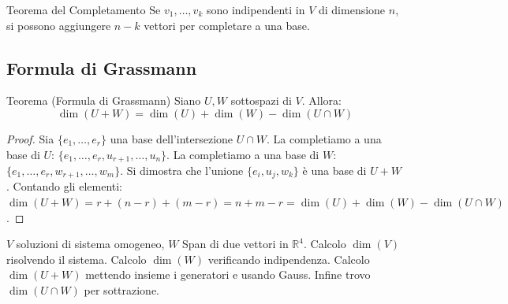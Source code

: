 \begin{concept}{Teorema del Completamento}
Se $v_1, \dots, v_k$ sono indipendenti in $V$ di dimensione $n$, si possono aggiungere $n-k$ vettori per completare a una base.
\end{concept}

\subsection{Formula di Grassmann}
\begin{concept}{Teorema (Formula di Grassmann)}
Siano $U, W$ sottospazi di $V$. Allora:
$$ \dim(U+W) = \dim(U) + \dim(W) - \dim(U \cap W) $$
\end{concept}

\begin{proof}
Sia $\{e_1, \dots, e_r\}$ una base dell'intersezione $U \cap W$.
La completiamo a una base di $U$: $\{e_1, \dots, e_r, u_{r+1}, \dots, u_n\}$.
La completiamo a una base di $W$: $\{e_1, \dots, e_r, w_{r+1}, \dots, w_m\}$.
Si dimostra che l'unione $\{e_i, u_j, w_k\}$ è una base di $U+W$.
Contando gli elementi:
$\dim(U+W) = r + (n-r) + (m-r) = n + m - r = \dim(U) + \dim(W) - \dim(U \cap W)$.
\end{proof}

\begin{exercisebox}[title={Esempio Grassmann}]
$V$ soluzioni di sistema omogeneo, $W$ Span di due vettori in $\mathbb{R}^4$.
Calcolo $\dim(V)$ risolvendo il sistema. Calcolo $\dim(W)$ verificando indipendenza.
Calcolo $\dim(U+W)$ mettendo insieme i generatori e usando Gauss.
Infine trovo $\dim(U \cap W)$ per sottrazione.
\end{exercisebox}
